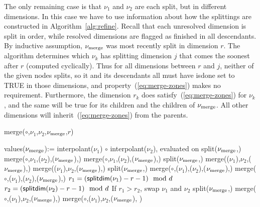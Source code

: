 The only remaining case is that $\nu_1$ and $\nu_2$ are each split, but in different dimensions. In this case we have to use information about how the splittings are constructed in Algorithm~\ref{alg:refine}. Recall that each unresolved dimension is split in order, while resolved dimensions are flagged as finished in all descendants. By inductive assumption, $\nu_\text{merge}$ was most recently split in dimension $r$. The algorithm determines which $\nu_k$ has splitting dimension $j$ that comes the soonest after $r$ (computed cyclically). Thus for all dimensions between $r$ and $j$, neither of the given nodes splits, so it and its descendants all must have \textsf{isdone} set to TRUE in those dimensions, and property~(\ref{eq:merge-zones}) makes no requirement. Furthermore, the dimension $r_k$ does satisfy~(\ref{eq:merge-zones}) for $\nu_k$, and the same will be true for its children and the children of $\nu_\text{merge}$. All other dimensions will inherit~(\ref{eq:merge-zones}) from the parents. 


\newcommand{\op}{\ensuremath{\circ}}
\begin{algorithm}[!h]
\caption{merge(\op,$\nu_1$,$\nu_2$,$\nu_\text{merge}$,$r$)}
\label{alg:merge}
\begin{algorithmic}
\STATE \textsf{values}($\nu_\text{merge}$):= \textsf{interpolant}($\nu_1$) $\op$ \textsf{interpolant}($\nu_2$), evaluated on 
\STATE split($\nu_\text{merge}$,)
\STATE merge(\op,$\nu_1$,($\nu_2$),($\nu_\text{merge}$),)
\STATE merge(\op,$\nu_1$,($\nu_2$),($\nu_\text{merge}$),)
\STATE split($\nu_\text{merge}$,)
\STATE merge(($\nu_1$),$\nu_2$,($\nu_\text{merge}$),)
\STATE merge(($\nu_1$),$\nu_2$,($\nu_\text{merge}$),)
\ELSE
{}
\STATE split($\nu_\text{merge}$,)
\STATE merge(\op,($\nu_1$),($\nu_2$),($\nu_\text{merge}$),)
\STATE merge(\op,($\nu_1$),($\nu_2$),($\nu_\text{merge}$),)
\ELSE
\STATE $r_1 = (\text{\textsf{splitdim}($\nu_1$)}-r-1) \mod d$
\STATE $r_2 = (\text{\textsf{splitdim}($\nu_2$)}-r-1) \mod d$
\STATE If $r_1>r_2$, swap $\nu_1$ and $\nu_2$
\STATE split($\nu_\text{merge}$,)
\STATE merge(\op,($\nu_1$),$\nu_2$,($\nu_\text{merge}$),)
\STATE merge(\op,($\nu_1$),$\nu_2$,($\nu_\text{merge}$), )
\ENDIF
\ENDIF
\end{algorithmic}
\end{algorithm}